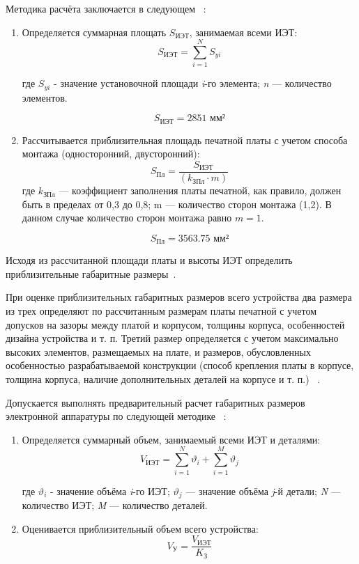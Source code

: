 Методика расчёта заключается в следующем ~\cite{Kostukevich2012}:
\begin{enumerate}
\item Определяется суммарная площать $S_{\textrm{ИЭТ}}$, занимаемая всеми ИЭТ:
  \begin{equation}
    S_{\textrm{ИЭТ}} = \sum^N_{i=1}S_{yi}
  \end{equation}

  где $S_{yi}$ - значение установочной площади \textit{i}-го элемента;
  \textit{n} —  количество элементов.

  $$ S_{\textrm{ИЭТ}}= 2851 \textrm{ мм²}$$

\item Рассчитывается приблизительная площадь печатной платы с учетом
  способа монтажа (односторонний, двусторонний):
  \begin{equation}
    S_{\textrm{Пл}} = \frac{S_{\textrm{ИЭТ}}}{(k_{\textrm{ЗПл}} \cdot m)}
  \end{equation}
  где $k_{\textrm{ЗПл}}$ — коэффициент заполнения платы печатной, как правило,
  должен быть в пределах от 0,3 до 0,8;
  m — количество сторон монтажа (1,2).
  В данном случае количество сторон монтажа равно $m=1$.

  $$S_{\textrm{Пл}} = 3563.75 \textrm{ мм²}$$
\end{enumerate}


Исходя из рассчитанной площади платы и высоты ИЭТ определить
приблизительные габаритные размеры~\cite{Kostukevich2012}.

При оценке приблизительных габаритных размеров всего устройства два
размера из трех определяют по рассчитанным размерам платы печатной с
учетом допусков на зазоры между платой и корпусом, толщины корпуса,
особенностей дизайна устройства и т. п.
Третий размер определяется с учетом максимально высоких элементов,
размещаемых на плате, и размеров, обусловленных особенностью
разрабатываемой конструкции (способ крепления платы в корпусе,
толщина корпуса, наличие дополнительных деталей на корпусе и т. п.) ~\cite{Kostukevich2012}.

Допускается выполнять предварительный расчет габаритных размеров
электронной аппаратуры по следующей методике ~\cite{Kostukevich2012}:
\begin{enumerate}
\item Определяется суммарный объем, занимаемый всеми ИЭТ и деталями:
  \begin{equation}
    V_{\textit{ИЭТ}} = \sum^N_{i=1}\vartheta_i +   \sum^M_{i=1}\vartheta_j
  \end{equation}

где $\vartheta_i$ - значение объёма \textit{i}-го ИЭТ;
$\vartheta_j$ — значение объёма \textit{j}-й детали;
\textit{N} — количество ИЭТ;
\textit{M} — количество деталей.
\item Оценивается приблизительный объем всего устройства:
  \begin{equation}
    V_{\textrm{У}} = \frac{V_{\textrm{ИЭТ}}}{K_{\textrm{З}}}
  \end{equation}
\end{enumerate}

